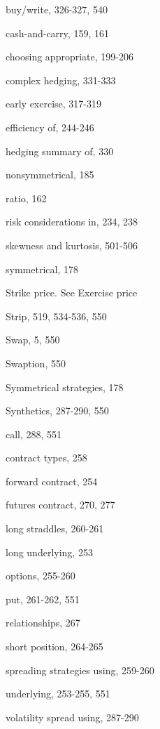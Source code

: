 \noindent buy/write, 326-327, 540\par
\noindent cash-and-carry, 159, 161\par
\noindent choosing appropriate, 199-206\par
\noindent complex hedging, 331-333\par
\noindent early exercise, 317-319\par
\noindent efficiency of, 244-246\par
\noindent hedging summary of, 330\par
\noindent nonsymmetrical, 185\par
\noindent ratio, 162\par
\noindent risk considerations in, 234, 238\par
\noindent skewness and kurtosis, 501-506\par
\noindent symmetrical, 178\par
\noindent Strike price. See Exercise price\par
\noindent Strip, 519, 534-536, 550\par
\noindent Swap, 5, 550\par
\noindent Swaption, 550\par
\noindent Symmetrical strategies, 178\par
\noindent Synthetics, 287-290, 550\par
\noindent call, 288, 551\par
\noindent contract types, 258\par
\noindent forward contract, 254\par
\noindent futures contract, 270, 277\par
\noindent long straddles, 260-261\par
\noindent long underlying, 253\par
\noindent options, 255-260\par
\noindent put, 261-262, 551\par
\noindent relationships, 267\par
\noindent short position, 264-265\par
\noindent spreading strategies using, 259-260\par
\noindent underlying, 253-255, 551\par
\noindent volatility spread using, 287-290\par

